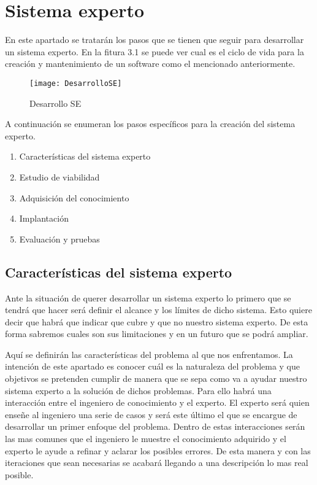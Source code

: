 \section{Sistema experto}
En este apartado se tratarán los pasos que se tienen que seguir para desarrollar un sistema experto.
 En la fitura 3.1 se puede ver cual es el ciclo de vida para la creación y mantenimiento de un software
 como el mencionado anteriormente.

\begin{figure}[htb]
  \centering
    \texttt{[image: DesarrolloSE]}
  \caption[Desarrollo SE]{Desarrollo SE}
  \label{fig:Desarrollo Sistema Experto}
\end{figure}

A continuación se enumeran los pasos específicos para la creación del sistema experto.
\begin{enumerate}
  \item Características del sistema experto
  \item Estudio de viabilidad
  \item Adquisición del conocimiento
  \item Implantación
  \item Evaluación y pruebas
\end{enumerate}

\subsection{Características del sistema experto}

Ante la situación de querer desarrollar un sistema experto lo primero que se tendrá
 que hacer será definir el alcance y los límites de dicho sistema. Esto quiere decir que
 habrá que indicar que cubre y que no nuestro sistema experto. De esta forma sabremos
 cuales son sus limitaciones y en un futuro que se podrá ampliar.


Aquí se definirán las características del problema al que nos enfrentamos.
 La intención de este apartado es conocer cuál es la naturaleza del problema
 y que objetivos se pretenden cumplir de manera que se sepa como va a ayudar
 nuestro sistema experto a la solución de dichos problemas. Para ello habrá
 una interacción entre el ingeniero de conocimiento y el experto. El experto
 será quien enseñe al ingeniero una serie de casos y será este último el que se
 encargue de desarrollar un primer enfoque del problema. Dentro de estas interacciones
 serán las mas comunes que el ingeniero le muestre el conocimiento adquirido
 y el experto le ayude a refinar y aclarar los posibles errores. De esta manera
 y con las iteraciones que sean necesarias se acabará llegando a una descripción
 lo mas real posible.

